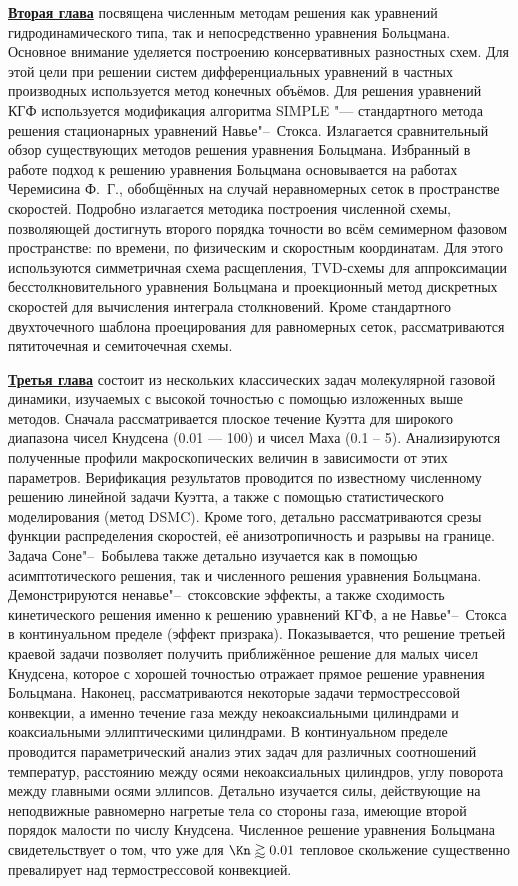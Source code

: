 \underline{\textbf{Вторая глава}} посвящена численным методам решения как уравнений гидродинамического типа,
так и непосредственно уравнения Больцмана.
Основное внимание уделяется построению консервативных разностных схем.
Для этой цели при решении систем дифференциальных уравнений в частных производных
используется метод конечных объёмов.
Для решения уравнений КГФ используется модификация алгоритма SIMPLE "--- стандартного метода решения
стационарных уравнений Навье"--~Стокса.
Излагается сравнительный обзор существующих методов решения уравнения Больцмана.
Избранный в работе подход к решению уравнения Больцмана основывается на работах Черемисина Ф.~Г.,
обобщённых на случай неравномерных сеток в пространстве скоростей.
Подробно излагается методика построения численной схемы, позволяющей достигнуть
второго порядка точности во всём семимерном фазовом пространстве:
по времени, по физическим и скоростным координатам.
Для этого используются симметричная схема расщепления, TVD-схемы для аппроксимации
бесстолкновительного уравнения Больцмана и проекционный метод дискретных скоростей
для вычисления интеграла столкновений.
Кроме стандартного двухточечного шаблона проецирования для равномерных сеток,
рассматриваются пятиточечная и семиточечная схемы.

\underline{\textbf{Третья глава}} состоит из нескольких классических задач молекулярной газовой динамики,
изучаемых с высокой точностью с помощью изложенных выше методов.
Сначала рассматривается плоское течение Куэтта для широкого диапазона чисел Кнудсена (0.01 --- 100)
и чисел Маха (0.1 -- 5). Анализируются полученные профили макроскопических величин в зависимости от
этих параметров. Верификация результатов проводится по известному численному решению линейной задачи Куэтта,
а также с помощью статистического моделирования (метод DSMC).
Кроме того, детально рассматриваются срезы функции распределения скоростей, её анизотропичность и разрывы на границе.
Задача Соне"--~Бобылева также детально изучается как в помощью асимптотического решения,
так и численного решения уравнения Больцмана. Демонстрируются ненавье"--~стоксовские эффекты,
а также сходимость кинетического решения именно к решению уравнений КГФ,
а не Навье"--~Стокса в континуальном пределе (эффект призрака).
Показывается, что решение третьей краевой задачи позволяет получить приближённое решение
для малых чисел Кнудсена, которое с хорошей точностью отражает прямое решение уравнения Больцмана.
Наконец, рассматриваются некоторые задачи термострессовой конвекции, а именно
течение газа между некоаксиальными цилиндрами и коаксиальными эллиптическими цилиндрами.
В континуальном пределе проводится параметрический анализ этих задач для различных соотношений температур,
расстоянию между осями некоаксиальных цилиндров, углу поворота между главными осями эллипсов.
Детально изучается силы, действующие на неподвижные равномерно нагретые тела со стороны газа,
имеющие второй порядок малости по числу Кнудсена.
Численное решение уравнения Больцмана свидетельствует о том, что уже для \(\Kn\gtrapprox0.01\)
тепловое скольжение существенно превалирует над термострессовой конвекцией.

